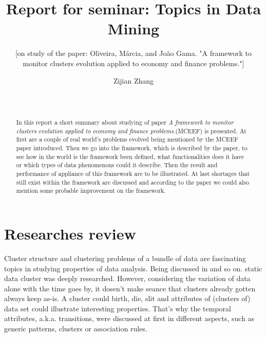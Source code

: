 \documentclass{sig-alternate-05-2015}
\begin{document}

\title{Report for seminar: Topics in Data Mining}
\subtitle{[on study of the paper: Oliveira, Márcia, and João Gama. "A framework to monitor clusters evolution applied to economy and finance problems."]
}
\author{
\alignauthor Zijian Zhang\\
        \\
        \\
}

\maketitle
\begin{abstract}
In this report a short summary about studying of paper \emph{A framework to monitor clusters evolution applied to economy and finance problems.}(MCEEF) is presented. At first are a couple of real world's problems evolved being mentioned by the MCEEF paper introduced. Then we go into the framework, which is described by the paper, to see how in the world is the framework been defined, what functionalities does it have or which types of data phenomenons could it describe. Then the result and performance of appliance of this framework are to be illustrated. At last shortages that still exist within the framework are discussed and according to the paper we could also mention some probable improvement on the framework.
\end{abstract}

\section{Researches review}
Cluster structure and clustering problems of a bundle of data are fascinating topics in studying properties of data analysis. Being discussed in \cite{JAIN:Clustering} and so on. static data cluster was deeply researched. However, considering the variation of data alone with the time goes by, it dosen't make seance that clusters already gotten always keep as-is. A cluster could birth, die, slit and attributes of (clusters of) data set could illustrate interesting properties. That's why the temporal attributes, a.k.a. transitions, were discussed at first in different aspects, such as generic patterns\cite{GANTI:datachar}\cite{BARTOLINI:panda}\cite{CHAWATHE:changedetection}, clusters\cite{SPILIOPOULOU:transition}\cite{FALKOWSKI:socialnet}\cite{YANG:spatiotemporal} or association rules\cite{BARON:monitorminingresults}\cite{BARON:webusagepattern}.
\end{document}
